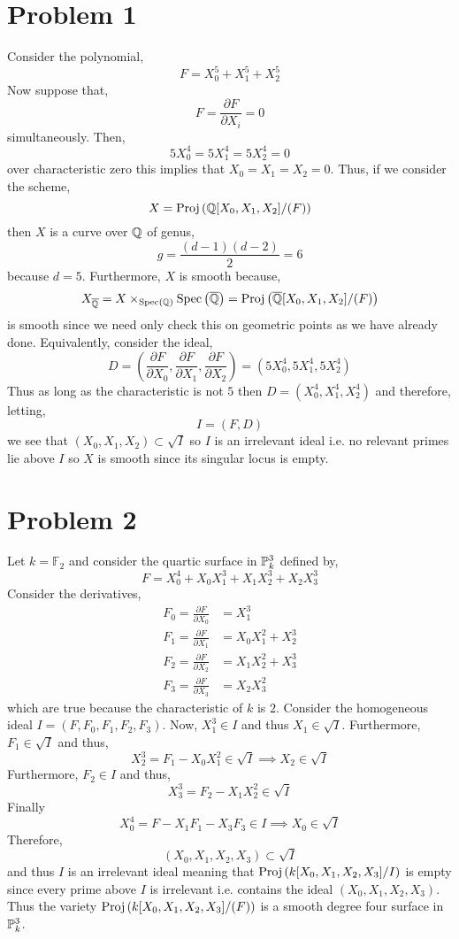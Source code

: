 \documentclass[12pt]{article}
\begin{document}

\section{Problem 1}

Consider the polynomial,
\[ F = X_0^5 + X_1^5 + X_2^5 \]
Now suppose that,
\[ F = \frac{\partial F}{\partial X_i} = 0 \]
simultaneously. Then,
\[ 5 X_0^4 = 5 X_1^4 = 5 X_2^4 = 0 \]
over characteristic zero this implies that $X_0 = X_1 = X_2 = 0$. Thus, if we consider the scheme,
\[ X = \Proj{\Q[X_0, X_1, X_2]/(F)} \]
then $X$ is a curve over $\Q$ of genus,
\[ g = \frac{(d-1)(d-2)}{2} = 6 \]
because $d = 5$. Furthermore, $X$ is smooth because,
\[ X_{\overline{\Q}} = X \times_{\Spec{\Q}} \Spec{\overline{\Q}} = \Proj{\overline{\Q}[X_0, X_1, X_2]/(F)} \]
is smooth since we need only check this on geometric points as we have already done. Equivalently, consider the ideal,
\[ D = \left( \frac{\partial F}{\partial X_0}, \frac{\partial F}{\partial X_1}, \frac{\partial F}{\partial X_2} \right) = (5 X_0^4, 5 X_1^4, 5 X_2^4) \]
Thus as long as the characteristic is not $5$ then $D = (X_0^4, X_1^4, X_2^4)$ and therefore, letting,
\[ I = (F, D) \]
we see that $(X_0, X_1, X_2) \subset \sqrt{I}$ so $I$ is an irrelevant ideal i.e. no relevant primes lie above $I$ so $X$ is smooth since its singular locus is empty. 

\section{Problem 2}

Let $k = \mathbb{F}_2$ and consider the quartic surface in $\P^3_k$ defined by,
\[ F = X_0^4 + X_0 X_1^3 + X_1 X_2^3 + X_2 X_3^3 \]
Consider the derivatives,
\begin{align*}
F_0 = \frac{\partial F}{\partial X_0} & = X_1^3
\\
F_1 = \frac{\partial F}{\partial X_1} & = X_0 X_1^2 + X_2^3
\\
F_2 = \frac{\partial F}{\partial X_2} & = X_1 X_2^2 + X_3^3
\\
F_3 = \frac{\partial F}{\partial X_3} & = X_2 X_3^2
\end{align*}
which are true because the characteristic of $k$ is $2$.
Consider the homogeneous ideal $I = (F, F_0, F_1, F_2, F_3)$. 
Now, $X_1^3 \in I$ and thus $X_1 \in \sqrt{I}$. Furthermore, $F_1 \in \sqrt{I}$ and thus,
\[ X_2^3 = F_1 - X_0 X_1^2 \in \sqrt{I} \implies X_2 \in \sqrt{I} \]
Furthermore, $F_2 \in I$ and thus,
\[ X_3^3 = F_2 - X_1 X_2^2 \in \sqrt{I} \]
Finally
\[ X_0^4 = F - X_1 F_1 - X_3 F_3  \in I \implies X_0 \in \sqrt{I} \]
Therefore,
\[ (X_0, X_1, X_2, X_3) \subset \sqrt{I} \]
and thus $I$ is an irrelevant ideal meaning that $\Proj{k[X_0,X_1,X_2,X_3]/I}$ is empty since every prime above $I$ is irrelevant i.e. contains the ideal $(X_0, X_1, X_2, X_3)$. Thus the variety $\Proj{k[X_0, X_1, X_2, X_3]/(F)}$ is a smooth degree four surface in $\P^3_k$. 
\end{document}
